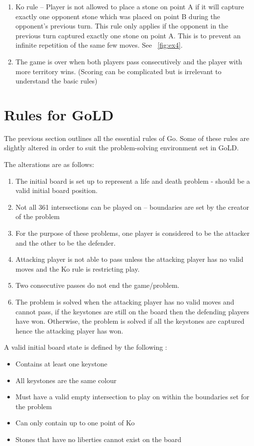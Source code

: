 \documentclass{l4proj}
\begin{document}
\begin{enumerate}
  \item Ko rule – Player is not allowed to place a stone on point A if it will capture exactly one opponent stone which was placed on point B during the opponent’s previous turn. This rule only applies if the opponent in the previous turn captured exactly one stone on point A. This is to prevent an infinite repetition of the same few moves. See ~\autoref{fig:ex4}.

  \item The game is over when both players pass consecutively and the player with more territory wins. (Scoring can be complicated but is irrelevant to understand the basic rules)

\end{enumerate}




\section{Rules for GoLD}
The previous section outlines all the essential rules of Go. Some of these rules are slightly altered in order to suit the problem-solving environment set in GoLD.

The alterations are as follows:
\begin{enumerate}

\item The initial board is set up to represent a life and death problem - should be a valid initial board position.
\item Not all 361 intersections can be played on – boundaries are set by the creator of the problem
\item For the purpose of these problems, one player is considered to be the attacker and the other to be the defender.
\item Attacking player is not able to pass unless the attacking player has no valid moves and the Ko rule is restricting play.
\item Two consecutive passes do not end the game/problem.
\item The problem is solved when the attacking player has no valid moves and cannot pass, if the keystones are still on the board then the defending players have won. Otherwise, the problem is solved if all the keystones are captured hence the attacking player has won.

\end{enumerate}


\bigskip
A valid initial board state is defined by the following :
\begin{itemize}
\item Contains at least one keystone
\item All keystones are the same colour
\item Must have a valid empty intersection to play on within the boundaries set for the problem
\item Can only contain up to one point of Ko
\item Stones that have no liberties cannot exist on the board
\end{itemize}
\end{document}
